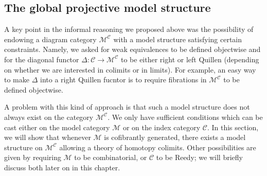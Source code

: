 \begin{refsection}
\subsection{The global projective model structure}

A key point in the informal reasoning we proposed above was the possibility of endowing a diagram category $\mathcal M^{\mathcal C}$ with a model structure satisfying certain constraints. Namely, we asked for weak equivalences to be defined objectwise and for the diagonal functor $\Delta \colon \mathcal C \to \mathcal M^{\mathcal C}$ to be either right or left Quillen (depending on whether we are interested in colimits or in limits). For example, an easy way to make $\Delta$ into a right Quillen fucntor is to require fibrations in $\mathcal M^{\mathcal C}$ to be defined objectwise.

A problem with this kind of approach is that such a model structure does not always exist on the category $\mathcal M^{\mathcal C}$. We only have sufficient conditions which can be cast either on the model category $\mathcal M$ or on the index category $\mathcal C$. In this section, we will show that whenever $\mathcal M$ is cofibrantly generated, there exists a model structure on $\mathcal M^{\mathcal C}$ allowing a theory of homotopy colimits. Other possibilities are given by requiring $\mathcal M$ to be combinatorial, or $\mathcal C$ to be Reedy; we will briefly discuss both later on in this chapter.


\end{refsection}
